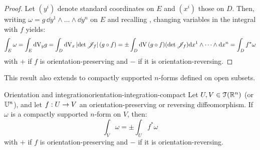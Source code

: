 \begin{proofbox}
  \begin{proof}
    Let $ (y^i) $ denote standard coordinates on $ E $ and $ (x^i) $ those on $ D $. Then, writing $ \omega = g \, \dd y^1 \wedge \dots \wedge \dd y^n $ on $ E $ and recalling , changing variables in the integral with $ f $ yields:
    \begin{equation*}
      \int_E \omega = \int_E \mathrm{d} \mathrm{V}_y g = \int_D \mathrm{d} \mathrm{V}_x \left\lvert\det \mathscr{J}_{f}\right\rvert (g \circ f) = \pm \int_D \mathrm{d} \mathrm{V} \, (g \circ f) (\det \mathscr{J}_{f}) \mathrm{d} x^1 \wedge \dots \wedge \mathrm{d} x^n = \int_D f^* \omega
    \end{equation*}
    with $ + $ if $ f $ is orientation-preserving and $ - $ if it is orientation-reversing.
  \end{proof}
\end{proofbox}

This result also extends to compactly supported $ n $-forms defined on open subsets.

\begin{proposition}{Orientation and integration}{orientation-integration-compact}
  Let $ U,V \in \EuScript{T}(\mathbb{R}^n) $ (or $ \mathbb{U}^n $), and let $ f : U \rightarrow V $ an orientation-preserving or reversing diffeomorphism. If $ \omega $ is a compactly supported $ n $-form on $ V $, then:
  \begin{equation*}
    \int_V \omega = \pm \int_U f^* \omega
  \end{equation*}
  with $ + $ if $ f $ is orientation-preserving and $ - $ if it is orientation-reversing.
\end{proposition}

